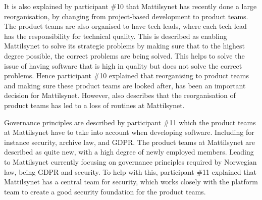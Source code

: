It is also explained by participant \#10 that Mattilsynet has recently done a large reorganisation, by changing from project-based development to product teams. The product teams are also organised to have tech leads, where each tech lead has the responsibility for technical quality. This is described as enabling Mattilsynet to solve its strategic problems by making sure that to the highest degree possible, the correct problems are being solved. This helps to solve the issue of having software that is high in quality but does not solve the correct problems. Hence participant \#10 explained that reorganising to product teams and making sure these product teams are looked after, has been an important decision for Mattilsynet. However, also describes that the reorganisation of product teams has led to a loss of routines at Mattilsynet.


Governance principles are described by participant \#11 which the product teams at Mattilsynet have to take into account when developing software. Including for instance security, archive law, and GDPR. The product teams at Mattilsynet are described as quite new, with a high degree of newly employed members. Leading to Mattilsynet currently focusing on governance principles required by Norwegian law, being GDPR and security. To help with this, participant \#11 explained that Mattilsynet has a central team for security, which works closely with the platform team to create a good security foundation for the product teams.


